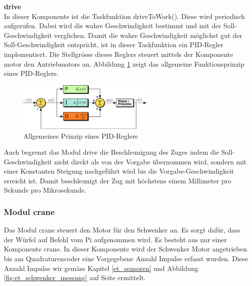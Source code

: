 \documentclass[../../main.tex]{subfiles}
\begin{document}
    \textbf{drive}\\
    In dieser Komponente ist die Taskfunktion driveToWork(). Diese wird periodisch aufgerufen. Dabei wird die wahre Geschwindigkeit bestimmt und mit der Soll-Geschwindigkeit verglichen. Damit die wahre Geschwindigkeit möglichst gut der Soll-Geschwindigkeit entspricht, ist in dieser Taskfunktion ein PID-Regler implementiert. Die Stellgrösse dieses Reglers steuert mittels der Komponente motor den Antriebmotors an. Abbildung \ref{fig:et_drive_pid} zeigt das allgemeine Funktionsprinzip eines PID-Reglers. 
    \nocite{PIDcontroller}

    \begin{figure}[H]
        \centering
        \includegraphics[width=0.6\textwidth]{../../images/et/et_wiki_PID_en.png}
        \caption {Allgemeines Prinzip eines PID-Reglers \cite{PIDcontroller}}
        \label{fig:et_drive_pid}
    \end{figure}

    Auch begrenzt das Modul drive die Beschleunigung des Zuges indem die Soll-Geschwindigkeit nicht direkt als von der Vorgabe übernommen wird, sondern mit einer Konstanten Steigung nachgeführt wird bis die Vorgabe-Geschwindigkeit erreicht ist. Damit beschleunigt der Zug mit höchstens einem Millimeter pro Sekunde pro Mikrosekunde.\\

    \subsubsection{Modul crane}
    Das Modul crane steuert den Motor für den Schwenker an. Es sorgt dafür, dass der Würfel auf Befehl vom Pi aufgenommen wird. Es besteht aus nur einer Komponente crane. In dieser Komponente wird der Schwenker Motor angetrieben bis am Quadraturencoder eine Vorgegebene Anzahl Impulse erfasst wurden. Diese Anzahl Impulse wir gemäss Kapitel \ref{et_sensoren} und Abbildung \ref{fig:et_schwenker_messung} auf Seite \pageref{fig:et_schwenker_messung} ermittelt.
    
\end{document}
